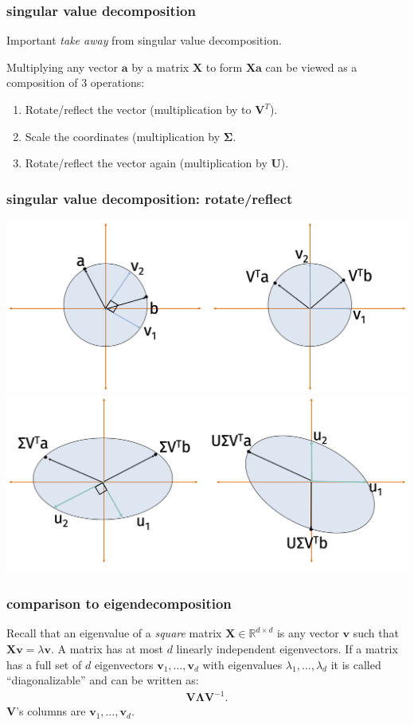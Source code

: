\documentclass[compress]{beamer}
\newcommand{\bs}[1]{\boldsymbol{#1}}
\newcommand{\bv}[1]{\mathbf{#1}}
\newcommand{\R}{\mathbb{R}}
\begin{document}
\begin{frame}[t]
	\frametitle{singular value decomposition}
	\begin{center}
		\alert{Important \emph{take away} from singular value decomposition.}
	\end{center}
	
	Multiplying any vector $\bv{a}$ by a matrix $\bv{X}$ to form $\bv{Xa}$ can be viewed as a composition of 3 operations:
	\begin{enumerate}
		\item Rotate/reflect the vector (multiplication by  to $\bv{V}^T$). 
		\item Scale the coordinates (multiplication by $\bs{\Sigma}$. 
		\item Rotate/reflect the vector again (multiplication by $\bv{U}$). 
	\end{enumerate}
\end{frame}

\begin{frame}[t]
	\frametitle{singular value decomposition: rotate/reflect}
	\begin{center}
		\includegraphics[width=.8\textwidth]{rotate1.png}
		\includegraphics[width=.8\textwidth]{rotate2.png}
	\end{center}
\end{frame}

\begin{frame}[t]
	\frametitle{comparison to eigendecomposition}
	Recall that an eigenvalue of a \emph{square} matrix $\bv{X} \in \R^{d\times d}$ is any vector $\bv{v}$ such that $\bv{X}\bv{v} = \lambda \bv{v}$. A matrix has at most $d$ linearly independent eigenvectors. If a matrix has a full set of $d$ eigenvectors $\bv{v}_1, \ldots, \bv{v}_d$ with eigenvalues $\lambda_1, \ldots, \lambda_d$ it is called ``diagonalizable'' and can be written as:
	\begin{align*}
		\bv{V}\bs{\Lambda}\bv{V}^{-1}.
	\end{align*}
	$\bv{V}$'s columns are $\bv{v}_1, \ldots, \bv{v}_d$.
\end{frame}
\end{document}
